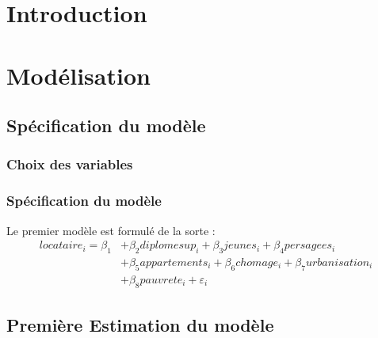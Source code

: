 \documentclass[]{article}
\begin{document}
\tableofcontents

\section{Introduction} 

\newpage
\section{Modélisation}
\subsection{Spécification du modèle}
\subsubsection{Choix des variables}
\subsubsection{Spécification du modèle}
Le premier modèle est formulé de la sorte : 
\begin{equation}
\begin{split}
		locataire_i =  \beta_1 &+ \beta_2diplomesup_i + \beta_3jeunes_i + \beta_4persagees_i \\
						&+ \beta_5appartements_i + \beta_6chomage_i + \beta_7urbanisation_i \\
						&+ \beta_8pauvrete_i + \varepsilon_i 
\end{split}
\end{equation}
\subsection{Première Estimation du modèle}
\end{document}
